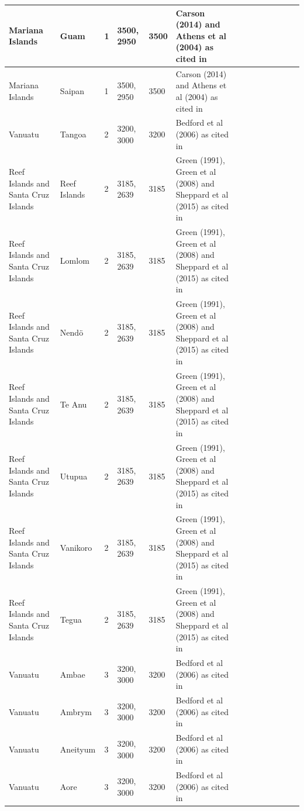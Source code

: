 \documentclass[a4paper,10pt]{article} %
\begin{document}
\begin{landscape}
\begin{longtable}{| p{3cm}| p{4cm}| p{4cm}|p{2cm}|p{2cm}|p{2cm}|p{2cm}|p{2cm}|p{2cm}|p{2cm}|p{2cm}|p{2cm}|p{2cm}|p{2cm}}
 Mariana Islands & Guam & 1 & 3500, 2950 & 3500 & Carson (2014) and Athens et al (2004) as cited in \citet{rieth_cochrane_2018} &   \\ \hline
 Mariana Islands & Saipan & 1 & 3500, 2950 & 3500 & Carson (2014) and Athens et al (2004) as cited in \citet{rieth_cochrane_2018} &   \\ \hline
 Vanuatu & Tangoa & 2 & 3200, 3000 & 3200 & Bedford et al (2006) as cited in \citet{rieth_cochrane_2018} &   \\ \hline
 Reef Islands and Santa Cruz Islands & Reef Islands & 2 & 3185, 2639 & 3185 & Green (1991), Green et al (2008) and Sheppard et al (2015) as cited in \citet{rieth_cochrane_2018} &   \\ \hline
 Reef Islands and Santa Cruz Islands & Lomlom & 2 & 3185, 2639 & 3185 & Green (1991), Green et al (2008) and Sheppard et al (2015) as cited in \citet{rieth_cochrane_2018} &   \\ \hline
 Reef Islands and Santa Cruz Islands & Nendö & 2 & 3185, 2639 & 3185 & Green (1991), Green et al (2008) and Sheppard et al (2015) as cited in \citet{rieth_cochrane_2018} &   \\ \hline
 Reef Islands and Santa Cruz Islands & Te Anu & 2 & 3185, 2639 & 3185 & Green (1991), Green et al (2008) and Sheppard et al (2015) as cited in \citet{rieth_cochrane_2018} &   \\ \hline
 Reef Islands and Santa Cruz Islands & Utupua & 2 & 3185, 2639 & 3185 & Green (1991), Green et al (2008) and Sheppard et al (2015) as cited in \citet{rieth_cochrane_2018} &   \\ \hline
 Reef Islands and Santa Cruz Islands & Vanikoro & 2 & 3185, 2639 & 3185 & Green (1991), Green et al (2008) and Sheppard et al (2015) as cited in \citet{rieth_cochrane_2018} &   \\ \hline
 Reef Islands and Santa Cruz Islands & Tegua & 2 & 3185, 2639 & 3185 & Green (1991), Green et al (2008) and Sheppard et al (2015) as cited in \citet{rieth_cochrane_2018} &   \\ \hline
 Vanuatu & Ambae & 3 & 3200, 3000 & 3200 & Bedford et al (2006) as cited in \citet{rieth_cochrane_2018} &   \\ \hline
 Vanuatu & Ambrym & 3 & 3200, 3000 & 3200 & Bedford et al (2006) as cited in \citet{rieth_cochrane_2018} &   \\ \hline
 Vanuatu & Aneityum & 3 & 3200, 3000 & 3200 & Bedford et al (2006) as cited in \citet{rieth_cochrane_2018} &   \\ \hline
 Vanuatu & Aore & 3 & 3200, 3000 & 3200 & Bedford et al (2006) as cited in \citet{rieth_cochrane_2018} &   \\ \hline

\end{longtable}
\end{landscape}
\end{document}
